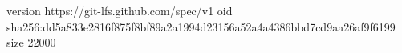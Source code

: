 version https://git-lfs.github.com/spec/v1
oid sha256:dd5a833e2816f875f8bf89a2a1994d23156a52a4a4386bbd7cd9aa26af9f6199
size 22000
